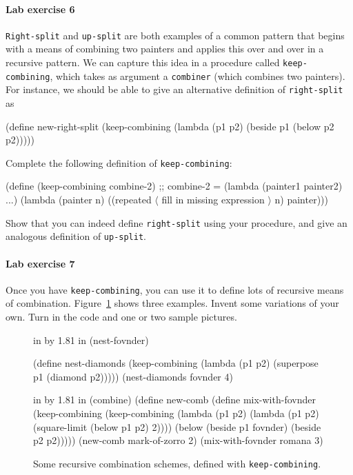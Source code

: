 \paragraph{Lab exercise 6}
{\tt Right-split} and {\tt up-split} are both examples of a common
pattern that begins with a means of combining two painters and applies
this over and over in a recursive pattern.  We can capture this idea
in a procedure called {\tt keep-combining}, which takes as argument a
{\tt combiner} (which combines two painters).  For instance, we should
be able to give an alternative definition of {\tt right-split} as

\beginlisp
(define new-right-split
  (keep-combining
   (lambda (p1 p2)
     (beside p1 (below p2 p2)))))
\endlisp

\noindent
Complete the following definition of {\tt keep-combining}:

\beginlisp
(define (keep-combining combine-2)
  ;; combine-2 = (lambda (painter1 painter2) ...)
  (lambda (painter n)
    ((repeated
      {\rm $\langle$ fill in missing expression $\rangle$}
      n)
     painter)))
\endlisp

\noindent
Show that you can indeed define {\tt right-split} using your
procedure, and give an analogous definition of {\tt up-split}.


\paragraph{Lab exercise 7}
Once you have {\tt keep-combining}, you can use it to define lots of
recursive means of combination.  Figure~\ref{keep-combining} shows
three examples.  Invent some variations of your own.  Turn in the code
and one or two sample pictures.

\begin{figure}
 in by 1.81 in (nest-fovnder)

\beginlisp
                     (define nest-diamonds
                       (keep-combining
                        (lambda (p1 p2) (superpose p1 (diamond p2)))))
\null
                     (nest-diamonds fovnder 4)
\endlisp

 in by 1.81 in (combine)
\beginlisp
     (define new-comb                              (define mix-with-fovnder
       (keep-combining                               (keep-combining
        (lambda (p1 p2)                               (lambda (p1 p2)
          (square-limit (below p1 p2) 2))))             (below (beside p1
                                                                       fovnder)
                                                               (beside p2 p2)))))
\null
     (new-comb mark-of-zorro 2)                     (mix-with-fovnder romana 3)
\endlisp
\caption{{\protect\footnotesize
Some recursive combination schemes, defined with {\tt keep-combining}.}}
\label{keep-combining}
\end{figure}

